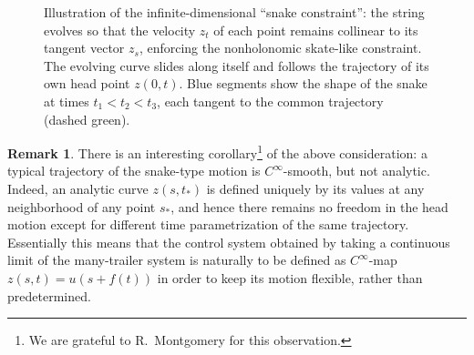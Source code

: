 \documentclass[11pt]{article}
\theoremstyle{definition}
\newtheorem{remark}[lemma]{Remark}
\newcounter{ai}
\begin{document}
\begin{figure}[ht]

\caption{Illustration of the infinite-dimensional ``snake constraint'': the string evolves so that the velocity \( z_t \) of each point remains collinear to its tangent vector \( z_s \), enforcing the nonholonomic skate-like constraint.  The evolving curve slides along itself and follows the trajectory of its own head point \( z(0,t) \).
Blue segments show the shape of the snake at times \( t_1 < t_2 < t_3 \), each tangent to the common trajectory (dashed green). }
\label{fig:snake-geometry} 
\end{figure}




\begin{remark}
There is an interesting corollary\footnote{We are grateful to R.~Montgomery for this observation.} of the above consideration: 
a typical trajectory of the snake-type motion is $C^\infty$-smooth, but not analytic. Indeed, an analytic curve $z(s, t_*)$ is defined 
uniquely by its values at any neighborhood of any point $s_*$, and hence there remains no freedom in the head motion except for different time parametrization of the same trajectory. Essentially this means 
that the control system obtained by taking  a continuous limit of the many-trailer system is naturally to be defined as 
$C^\infty$-map $z(s,t)=u(s+f(t))$ in order to keep its motion flexible, rather than predetermined.
\end{remark}
\end{document}
